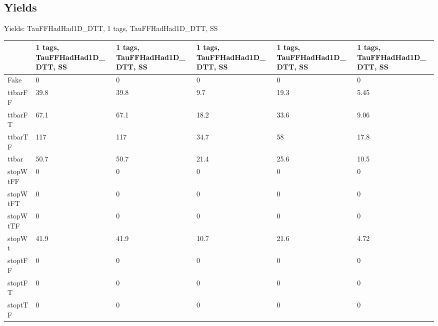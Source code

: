 
\subsection{Yields}

\begin{frame}{Yields: TauFFHadHad1D\_DTT, 1 tags, TauFFHadHad1D\_DTT, SS}
\begin{center}
  \begin{tabular}{l| >{\centering\let\newline\\\arraybackslash\hspace{0pt}}m{1.4cm}| >{\centering\let\newline\\\arraybackslash\hspace{0pt}}m{1.4cm}| >{\centering\let\newline\\\arraybackslash\hspace{0pt}}m{1.4cm}| >{\centering\let\newline\\\arraybackslash\hspace{0pt}}m{1.4cm}| >{\centering\let\newline\\\arraybackslash\hspace{0pt}}m{1.4cm}}
    & 1 tags, TauFFHadHad1D\_DTT, SS & 1 tags, TauFFHadHad1D\_DTT, SS & 1 tags, TauFFHadHad1D\_DTT, SS & 1 tags, TauFFHadHad1D\_DTT, SS & 1 tags, TauFFHadHad1D\_DTT, SS \\
 \hline \hline
    Fake& 0 & 0 & 0 & 0 & 0 \\
 \hline
    ttbarFF& 39.8 & 39.8 & 9.7 & 19.3 & 5.45 \\
 \hline
    ttbarFT& 67.1 & 67.1 & 18.2 & 33.6 & 9.06 \\
 \hline
    ttbarTF& 117 & 117 & 34.7 & 58 & 17.8 \\
 \hline
    ttbar& 50.7 & 50.7 & 21.4 & 25.6 & 10.5 \\
 \hline
    stopWtFF& 0 & 0 & 0 & 0 & 0 \\
 \hline
    stopWtFT& 0 & 0 & 0 & 0 & 0 \\
 \hline
    stopWtTF& 0 & 0 & 0 & 0 & 0 \\
 \hline
    stopWt& 41.9 & 41.9 & 10.7 & 21.6 & 4.72 \\
 \hline
    stoptFF& 0 & 0 & 0 & 0 & 0 \\
 \hline
    stoptFT& 0 & 0 & 0 & 0 & 0 \\
 \hline
    stoptTF& 0 & 0 & 0 & 0 & 0 \\

\end{tabular}
\end{center}
\end{frame}
